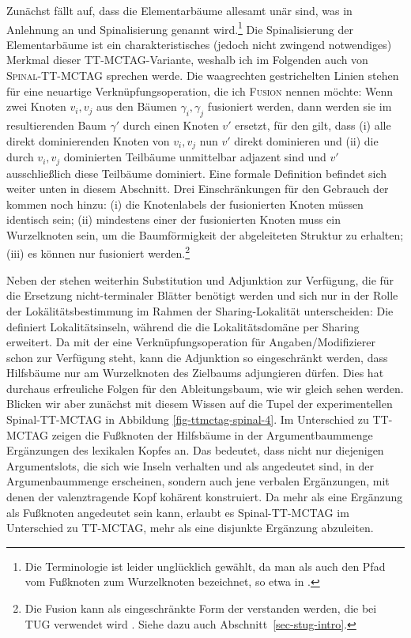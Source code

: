 Zunächst fällt auf, dass die Elementarbäume allesamt unär sind, was in Anlehnung an \cite{Shen:06} und \cite{Shen:etal:08} Spinalisierung genannt wird.\footnote{Die Terminologie ist leider unglücklich gewählt, da man als  auch den Pfad vom Fu\ss knoten zum Wurzelknoten bezeichnet, so etwa in \cite{Schabes:Waters:95}.} Die Spinalisierung der Elementarbäume ist ein charakteristisches (jedoch nicht zwingend notwendiges) Merkmal dieser TT-MCTAG-Variante, weshalb ich im Folgenden auch von \textsc{Spinal-TT-MCTAG} sprechen werde. Die waagrechten gestrichelten Linien stehen für eine neuartige Verknüpfungsoperation, die ich \textsc{Fusion} nennen möchte: Wenn zwei Knoten $v_i,v_j$ aus den Bäumen $\gamma_i,\gamma_j$ fusioniert werden, dann werden sie im resultierenden Baum $\gamma'$ durch einen Knoten $v'$ ersetzt, für den gilt, dass (i) alle direkt dominierenden Knoten von $v_i, v_j$ nun $v'$ direkt dominieren und (ii) die durch $v_i,v_j$ dominierten Teilbäume unmittelbar adjazent sind und $v'$ ausschlie\ss lich diese Teilbäume dominiert.   
Eine formale Definition befindet sich weiter unten in diesem Abschnitt. Drei Einschränkungen für den Gebrauch der  kommen noch hinzu: (i) die Knotenlabels der fusionierten Knoten müssen identisch sein; (ii) mindestens einer der fusionierten Knoten muss ein Wurzelknoten sein, um die Baumförmigkeit der abgeleiteten Struktur zu erhalten; (iii) es können nur  fusioniert werden.\footnote{Die Fusion kann als eingeschränkte Form der  verstanden werden, die bei TUG verwendet wird \citep{Popowich:89,Gerdes:04}. Siehe dazu auch Abschnitt~\ref{sec-stug-intro}.} 

Neben der  stehen weiterhin Substitution und Adjunktion zur Verfügung, die für die Ersetzung nicht-terminaler Blätter benötigt werden und sich nur in der Rolle der Lokälitätsbestimmung im Rahmen der Sharing-Lokalität unterscheiden: Die  definiert Lokalitätsinseln, während die  die Lokalitätsdomäne per Sharing erweitert. Da mit der  eine Verknüpfungsoperation für Angaben/Modifizierer schon zur Verfügung steht, kann die Adjunktion so eingeschränkt werden, dass Hilfsbäume nur am Wurzelknoten des Zielbaums adjungieren dürfen. Dies hat durchaus erfreuliche Folgen für den Ableitungsbaum, wie wir gleich sehen werden. Blicken wir aber zunächst mit diesem Wissen auf die Tupel der experimentellen Spinal-TT-MCTAG in Abbildung \ref{fig-ttmctag-spinal-4}. 
Im Unterschied zu TT-MCTAG zeigen die Fu\ss knoten der Hilfsbäume in der Argumentbaummenge Ergänzungen des lexikalen Kopfes an. Das bedeutet, dass nicht nur diejenigen Argumentslots, die sich wie Inseln verhalten und als  angedeutet sind, in der Argumenbaummenge erscheinen,  sondern auch jene verbalen Ergänzungen, mit denen der valenztragende Kopf kohärent konstruiert. Da mehr als eine Ergänzung als Fu\ss knoten angedeutet sein kann, erlaubt es Spinal-TT-MCTAG im Unterschied zu TT-MCTAG, mehr als eine disjunkte Ergänzung abzuleiten.  

